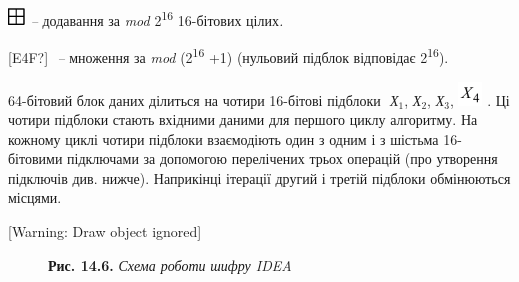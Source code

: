 \documentclass[a4paper]{article}
\newcommand\textsubscript[1]{\ensuremath{{}_{\text{#1}}}}
\newcounter{}
\begin{document}
 \includegraphics[width=0.1874in,height=0.1874in]{crypt-img/crypt-img300.png}
\textit{ – }додавання за \textit{mod}\textit{ }2\textsuperscript{16}\textit{ 
}16-бітових цілих\textit{.}

\textlatin{[E4F?]} $ $ \textit{– }множення за \textit{mod}
(2\textsuperscript{16} +1) (нульовий підблок відповідає 2\textsuperscript{16}).

 64-бітовий блок даних ділиться на чотири 16-бітові підблоки  $ $
\textit{Х}\textit{\textsubscript{1}}, \textit{Х}\textit{\textsubscript{2}},
\textit{Х}\textit{\textsubscript{3}}, 
\includegraphics[width=0.25in,height=0.25in]{crypt-img/crypt-img301.png} . Ці
чотири підблоки стають вхідними даними для першого циклу алгоритму. На кожному
циклі чотири підблоки взаємодіють один з одним і з шістьма 16-бітовими 
підключами за допомогою перелічених трьох операцій (про утворення підключів
див. нижче).  Наприкінці ітерації  другий  і третій підблоки обмінюються 
місцями. 


\bigskip

[Warning: Draw object ignored]


\bigskip


\bigskip


\bigskip


\bigskip


\bigskip


\bigskip


\bigskip


\bigskip


\bigskip


\bigskip


\bigskip


\bigskip


\bigskip


\bigskip


\bigskip


\bigskip


\bigskip


\bigskip


\bigskip


\bigskip


\bigskip



\begin{figure}
\centering
\begin{minipage}{}
{\centering
\textbf{Рис. 14.6.} \textit{Схема роботи }\textit{шифру IDEA}
\par}
\end{minipage}
\end{figure}
\end{document}
